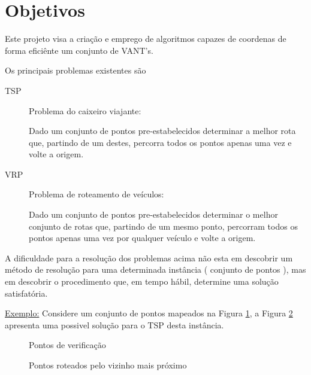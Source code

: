 \documentclass[a4paper, 12pt]{article}
\begin{document}

\newpage


\section{Objetivos}

	Este projeto visa a criação e emprego de algoritmos capazes de coordenas de
forma eficiênte um conjunto de VANT's.

	Os principais problemas existentes são
\begin{description}
	\item[TSP] Problema do caixeiro viajante:

	Dado um conjunto de pontos pre-estabelecidos determinar a melhor rota que,
partindo de um destes, percorra todos os pontos apenas uma vez e volte a origem.

	\item[VRP] Problema de roteamento de veículos:

	Dado um conjunto de pontos pre-estabelecidos determinar o melhor conjunto de
rotas que, partindo de um mesmo ponto, percorram todos os pontos apenas uma vez
por qualquer veículo e volte a origem.
\end{description}

	A dificuldade para a resolução dos problemas acima não esta em descobrir um
método de resolução para uma determinada instância ( conjunto de pontos ), mas
em descobrir o procedimento que, em tempo hábil, determine uma solução
satisfatória.


\underline{Exemplo:}
	Considere um conjunto de pontos mapeados na Figura \ref{test}, a Figura
\ref{roteado} apresenta uma possivel solução para o TSP desta instância.


\begin{figure}[!ht]
\centering
{}
\caption{Pontos de verificação}
\label{test}
\end{figure}
\begin{figure}[!ht]
\centering
{}
\caption{Pontos roteados pelo vizinho mais próximo}
\label{roteado}
\end{figure}
\end{document}
